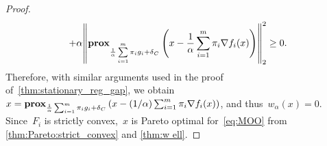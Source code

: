 \documentclass[../../main]{subfiles}
\begin{document}
\begin{proof}
\begin{multline}
                                + \alpha \norm*{\prox_{\frac{1}{\alpha} \sum\limits_{i = 1}^{m} \pi_i g_i + \indicator_C}\left( x - \frac{1}{\alpha} \sum_{i = 1}^{m} \pi_i \nabla f_i(x) \right)}_2^2 \ge 0
                            .\end{multline}
                            Therefore, with similar arguments used in the proof of~\cref{thm:stationary_reg_gap}, we obtain~$x = \operatorname{\mathbf{prox}}_{\frac{1}{\alpha} \sum_{i = 1}^{m} \pi_i g_i + \operatorname{\delta}_C}\left( x - (1 / \alpha) \sum_{i = 1}^{m} \pi_i \nabla f_i(x) \right)$, and thus~$w_\alpha(x) = 0$.
                            Since~$F_i$ is strictly convex,~$x$ is Pareto optimal for~\cref{eq:MOO} from \cref{thm:Pareto:strict_convex} and \cref{thm:w ell}.
                        \end{proof}
                        
\end{document}
